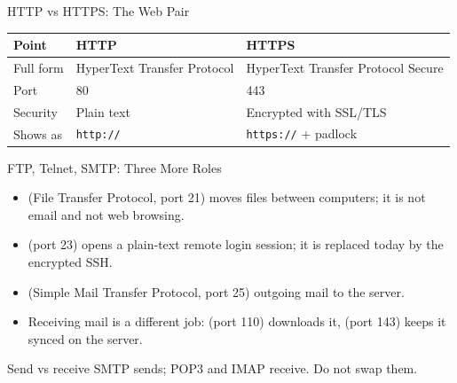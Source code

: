 \documentclass[aspectratio=169]{beamer}
\begin{document}
\begin{frame}{HTTP vs HTTPS: The Web Pair}
  \begin{center}
    \begin{tabular}{lll}
      \toprule
      \textbf{Point} & \textbf{HTTP} & \textbf{HTTPS} \\
      \midrule
      Full form & HyperText Transfer Protocol & HyperText Transfer Protocol Secure \\
      Port & 80 & 443 \\
      Security & Plain text & Encrypted with SSL/TLS \\
      Shows as & \texttt{http://} & \texttt{https://} + padlock \\
      \bottomrule
    \end{tabular}
  \end{center}
  \vspace{0.25cm}
\end{frame}

\begin{frame}{FTP, Telnet, SMTP: Three More Roles}
  \begin{itemize}
    \item {} (File Transfer Protocol, port 21) moves files between
      computers; it is not email and not web browsing.
    \item {} (port 23) opens a plain-text remote login session; it
      is replaced today by the encrypted SSH.
    \item {} (Simple Mail Transfer Protocol, port 25) 
      outgoing mail to the server.
    \item Receiving mail is a different job:  (port 110) downloads
      it,  (port 143) keeps it synced on the server.
  \end{itemize}
  \begin{block}{Send vs receive}
    SMTP sends; POP3 and IMAP receive. Do not swap them.
  \end{block}
\end{frame}
\end{document}
